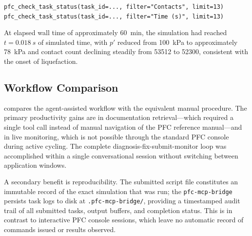 \begin{verbatim}
pfc_check_task_status(task_id=..., filter="Contacts", limit=13)
pfc_check_task_status(task_id=..., filter="Time (s)", limit=13)
\end{verbatim}

At elapsed wall time of approximately \SI{60}{min}, the simulation had reached $t = \SI{0.018}{s}$ of simulated time, with $p'$ reduced from \SI{100}{kPa} to approximately \SI{78}{kPa} and contact count declining steadily from \num{53512} to \num{52300}, consistent with the onset of liquefaction.

\subsection{Workflow Comparison}
\label{sec:demo:comparison}


 compares the agent-assisted workflow with the equivalent manual procedure. The primary productivity gains are in documentation retrieval---which required a single tool call instead of manual navigation of the PFC reference manual---and in live monitoring, which is not possible through the standard PFC console during active cycling. The complete diagnosis-fix-submit-monitor loop was accomplished within a single conversational session without switching between application windows.


A secondary benefit is reproducibility. The submitted script file constitutes an immutable record of the exact simulation that was run; the \texttt{pfc-mcp-bridge} persists task logs to disk at \texttt{.pfc-mcp-bridge/}, providing a timestamped audit trail of all submitted tasks, output buffers, and completion status. This is in contrast to interactive PFC console sessions, which leave no automatic record of commands issued or results observed.
